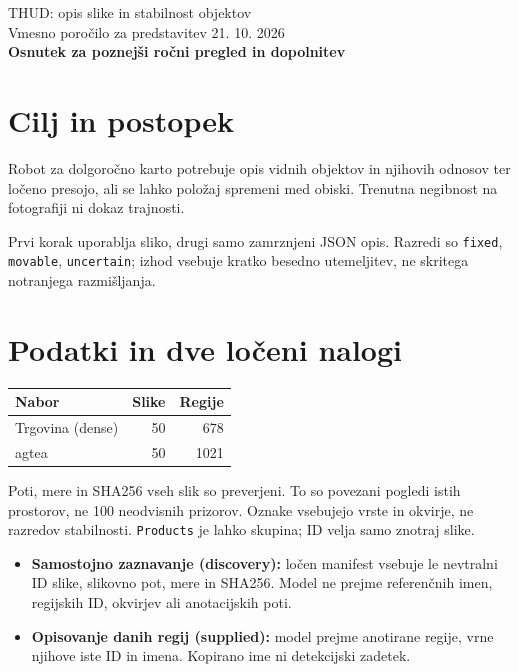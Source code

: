 \documentclass[10pt,a4paper]{article}
\begin{document}
\begin{center}{\LARGE THUD: opis slike in stabilnost objektov}\\[5pt]
{\large Vmesno poročilo za predstavitev 21. 10. 2026}\\[4pt]
\textbf{Osnutek za poznejši ročni pregled in dopolnitev}\end{center}
\section*{Cilj in postopek}
Robot za dolgoročno karto potrebuje opis vidnih objektov in njihovih odnosov ter ločeno presojo, ali se lahko položaj spremeni med obiski. Trenutna negibnost na fotografiji ni dokaz trajnosti.
\begin{center}\end{center}
Prvi korak uporablja sliko, drugi samo zamrznjeni JSON opis. Razredi so \texttt{fixed}, \texttt{movable}, \texttt{uncertain}; izhod vsebuje kratko besedno utemeljitev, ne skritega notranjega razmišljanja.
\section*{Podatki in dve ločeni nalogi}
\begin{center}\small\begin{tabular}{lrr}\toprule
Nabor & Slike & Regije \\ \midrule
Trgovina (dense) & 50 & 678 \\
agtea & 50 & 1021 \\
\bottomrule\end{tabular}\end{center}

Poti, mere in SHA256 vseh slik so preverjeni. To so povezani pogledi istih prostorov, ne 100 neodvisnih prizorov. Oznake vsebujejo vrste in okvirje, ne razredov stabilnosti. \texttt{Products} je lahko skupina; ID velja samo znotraj slike.
\begin{itemize}\item \textbf{Samostojno zaznavanje (discovery):} ločen manifest vsebuje le nevtralni ID slike, slikovno pot, mere in SHA256. Model ne prejme referenčnih imen, regijskih ID, okvirjev ali anotacijskih poti.
\item \textbf{Opisovanje danih regij (supplied):} model prejme anotirane regije, vrne njihove iste ID in imena. Kopirano ime ni detekcijski zadetek.\end{itemize}
\end{document}
